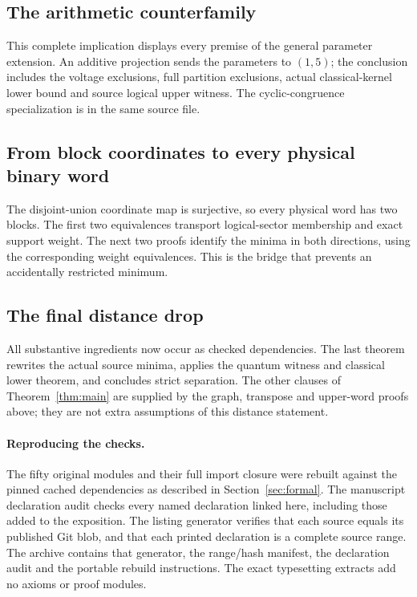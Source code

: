 \subsection{The arithmetic counterfamily}
This complete implication displays every premise of the general parameter
extension. An additive projection sends the parameters to $(1,5)$; the
conclusion includes the voltage exclusions, full partition exclusions,
actual classical-kernel lower bound and source logical upper witness.
The cyclic-congruence specialization is in the same source file.

\subsection{From block coordinates to every physical binary word}
The disjoint-union coordinate map is surjective, so every physical word
has two blocks. The first two equivalences transport logical-sector
membership and exact support weight. The next two proofs identify the
minima in both directions, using the corresponding weight equivalences.
This is the bridge that prevents an accidentally restricted minimum.

\subsection{The final distance drop}
All substantive ingredients now occur as checked dependencies. The
last theorem rewrites the actual source minima, applies the quantum
witness and classical lower theorem, and concludes strict separation.
The other clauses of Theorem~\ref{thm:main} are supplied by the graph,
transpose and upper-word proofs above; they are not extra assumptions
of this distance statement.

\paragraph{Reproducing the checks.}
The fifty original modules and their full import closure were rebuilt
against the pinned cached dependencies as described in
Section~\ref{sec:formal}. The manuscript declaration audit checks every
named declaration linked here, including those added to the exposition.
The listing generator verifies that each source equals its published
Git blob, and that each printed declaration is a complete source range.
The archive contains that generator, the range/hash manifest, the
declaration audit and the portable rebuild instructions. The exact
typesetting extracts add no axioms or proof modules.



